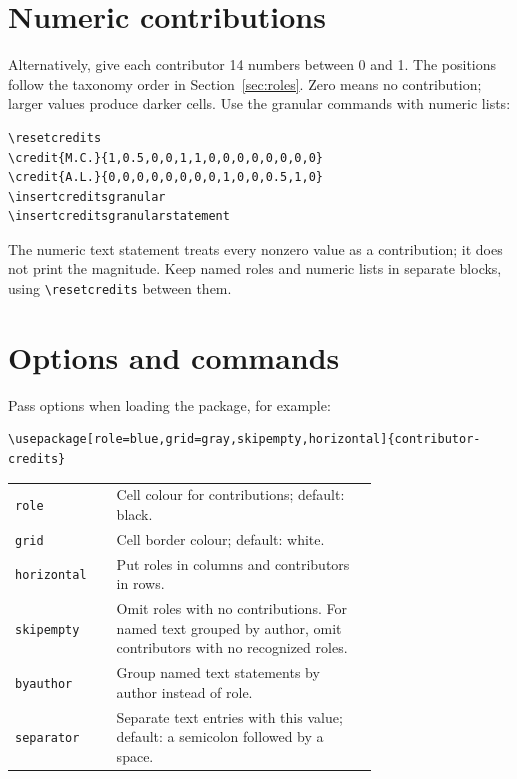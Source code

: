 \documentclass[a4paper,11pt]{article}
\begin{document}
\resetcredits
{}
\begin{center}
\insertcredits
\end{center}

\section{Numeric contributions}

Alternatively, give each contributor 14 numbers between 0 and 1.
The positions follow the taxonomy order in Section~\ref{sec:roles}.
Zero means no contribution; larger values produce darker cells.
Use the granular commands with numeric lists:

\begin{verbatim}
\resetcredits
\credit{M.C.}{1,0.5,0,0,1,1,0,0,0,0,0,0,0,0}
\credit{A.L.}{0,0,0,0,0,0,0,0,1,0,0,0.5,1,0}
\insertcreditsgranular
\insertcreditsgranularstatement
\end{verbatim}

\resetcredits
{}
\begin{center}
\insertcreditsgranular
\end{center}
\noindent\insertcreditsgranularstatement

\medskip
The numeric text statement treats every nonzero value as a contribution;
it does not print the magnitude. Keep named roles and numeric lists in
separate blocks, using \verb|\resetcredits| between them.

\section{Options and commands}

Pass options when loading the package, for example:
\begin{verbatim}
\usepackage[role=blue,grid=gray,skipempty,horizontal]{contributor-credits}
\end{verbatim}

\noindent\begin{tabular}{@{}lp{0.72\linewidth}@{}}
\texttt{role} & Cell colour for contributions; default: black.\\
\texttt{grid} & Cell border colour; default: white.\\
\texttt{horizontal} & Put roles in columns and contributors in rows.\\
\texttt{skipempty} & Omit roles with no contributions. For named text grouped
  by author, omit contributors with no recognized roles.\\
\texttt{byauthor} & Group named text statements by author instead of role.\\
\texttt{separator} & Separate text entries with this value; default: a
  semicolon followed by a space.\\
\end{tabular}
\end{document}
